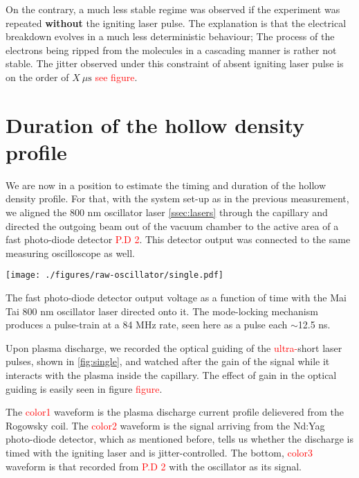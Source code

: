 \documentclass[nofonts]{tufte-book}
\begin{document}
On the contrary, a much less stable regime was observed if the experiment was repeated \textbf{without} the igniting laser pulse. The explanation is that the electrical breakdown evolves in a much less deterministic behaviour; The process of the electrons being ripped from the molecules in a cascading manner is rather not stable. The jitter observed under this constraint of absent igniting laser pulse is on the order of $X \ \mu \text{s}$  \textcolor{red}{see figure}.

\section{Duration of the hollow density profile}\label{sec:duration-of-guiding}
We are now in a position to estimate the timing and duration of the hollow density profile. For that, with the system set-up as in the previous measurement, we aligned the 800 nm oscillator laser \ref{ssec:lasers} through the capillary and directed the outgoing beam out of the vacuum chamber to the active area of a fast photo-diode detector \textcolor{red}{P.D 2}. This detector output was connected to the same measuring oscilloscope as well.

\begin{marginfigure}
		    \texttt{[image: ./figures/raw-oscillator/single.pdf]}
		    \caption{The fast photo-diode detector output voltage as a function of time with the Mai Tai 800 nm oscillator laser directed onto it. The mode-locking mechanism produces a pulse-train at a 84 MHz rate, seen here as a pulse each $\sim$12.5 ns.}
		    \label{fig:single}
\end{marginfigure}
Upon plasma discharge, we recorded the optical guiding of the \textcolor{red}{ultra-}short laser pulses, shown in \ref{fig:single}, and watched after the gain of the signal while it interacts with the plasma inside the capillary. The effect of gain in the optical guiding is easily seen in figure \textcolor{red}{figure}.

The \textcolor{red}{color1} waveform is the plasma discharge current profile delievered from the Rogowsky coil. The \textcolor{red}{color2} waveform is the signal arriving from the Nd:Yag photo-diode detector, which as mentioned before, tells us whether the discharge is timed with the igniting laser and is jitter-controlled. The bottom, \textcolor{red}{color3} waveform is that recorded from \textcolor{red}{P.D 2} with the oscillator as its signal. 
\end{document}
